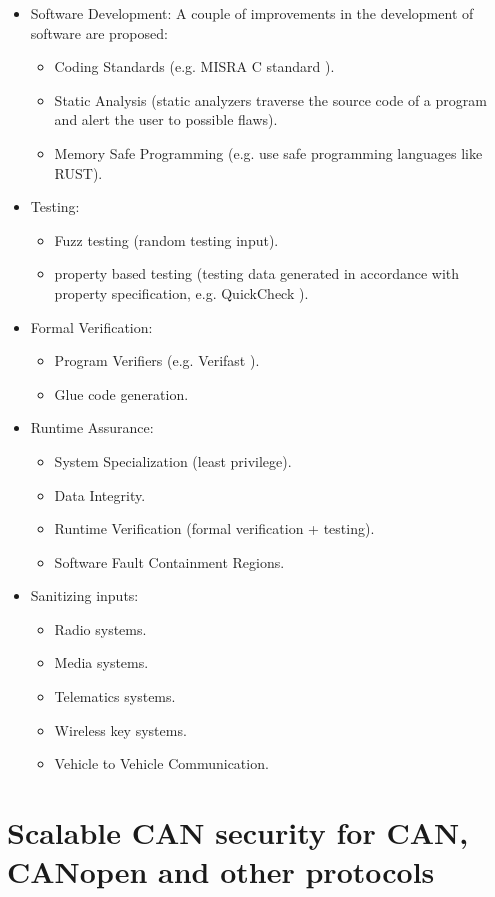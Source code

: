 \documentclass[11pt]{article}
\begin{document}
\begin{itemize}
	\item Software Development: A couple of improvements in the development of software are proposed: \begin{itemize}
		\item Coding Standards (e.g. MISRA C standard \cite{MISRA}).
		\item Static Analysis (static analyzers traverse the source code of a program and alert the user to possible flaws).
		\item Memory Safe Programming (e.g. use safe programming languages like RUST).
	\end{itemize}
	\item Testing:
	\begin{itemize}
		\item Fuzz testing (random testing input).
		\item property based testing (testing data generated in accordance with property specification, e.g. QuickCheck \cite{Quickheck}).
	\end{itemize}
	\item Formal Verification: \begin{itemize}
		\item Program Verifiers (e.g. Verifast \cite{Verifast}).
		\item Glue code generation.
	\end{itemize}
	\item Runtime Assurance: \begin{itemize}
		\item System Specialization (least privilege).
		\item Data Integrity.
		\item Runtime Verification (formal verification + testing).
		\item Software Fault Containment Regions.
	\end{itemize}
	\item Sanitizing inputs: \begin{itemize}
		\item Radio systems.
		\item Media systems.
		\item Telematics systems.
		\item Wireless key systems.
		\item Vehicle to Vehicle Communication.
	\end{itemize}
\end{itemize}

\section{Scalable CAN security for CAN, CANopen and other protocols}
\end{document}

